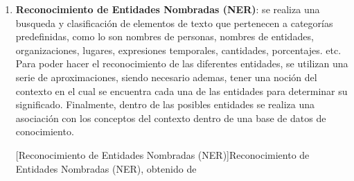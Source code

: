 \begin{enumerate}
\item \textbf{Reconocimiento de Entidades Nombradas (NER)}: se realiza una busqueda y clasificación de elementos de texto que pertenecen a categorías predefinidas, como lo son nombres de personas, nombres de entidades, organizaciones, lugares, expresiones temporales, cantidades, porcentajes. etc.
Para poder hacer el reconocimiento de las diferentes entidades, se utilizan una serie de aproximaciones, siendo necesario ademas, tener una noción del contexto en el cual se encuentra cada una de las entidades para determinar su significado. Finalmente, dentro de las posibles entidades se realiza una asociación con los conceptos del contexto dentro de una base de datos de conocimiento.
\begin{center}
    [Reconocimiento de Entidades Nombradas (NER)]{Reconocimiento de Entidades Nombradas (NER), obtenido de \cite{ref47}}  %
\end{center}



\end{enumerate}
